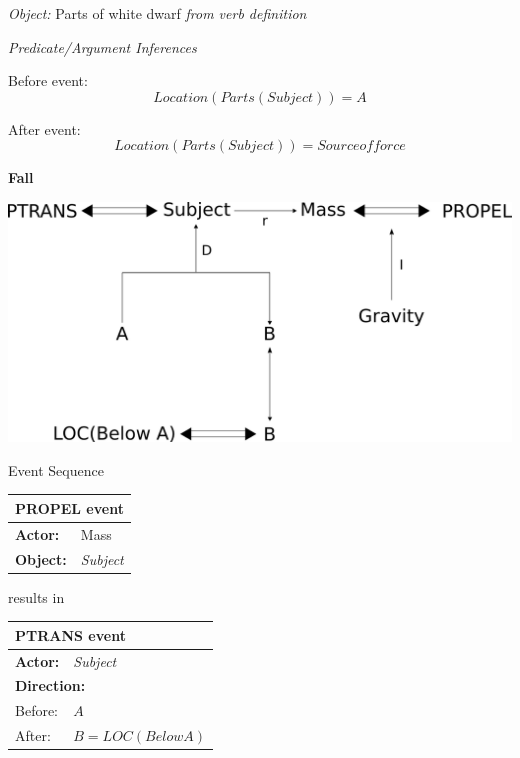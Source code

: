 \documentclass[../dissertation]{subfiles}
\begin{document}
\textit{Object:} Parts of white dwarf \textit{from verb definition}

\bigskip

\textit{Predicate/Argument Inferences}


Before event:
\[Location(Parts(Subject)) = A\]

After event:
\[Location(Parts(Subject)) = Source of force\]
\newpage

\textbf{Fall}

\bigskip
\includegraphics[width=\linewidth]{fall-cd.png}


Event Sequence

\begin{center}
  \begin{tabular}{l l}
  \toprule
  \multicolumn{2}{l}{\textbf{PROPEL event}}\\
  \hline
  \textbf{Actor:} & Mass\\
  \textbf{Object:} & \textit{Subject}\\
	\bottomrule
  \end{tabular}
  
  \smallskip
  results in
  \smallskip
  
  \begin{tabular}{l l}
    \toprule
    \multicolumn{2}{l}{\textbf{PTRANS event}}\\
    \hline
    \textbf{Actor:} & \textit{Subject}\\
    \multicolumn{2}{l}{\textbf{Direction:}} \\
    Before: & \(A\)\\
    After: & \(B = LOC(Below A)\)\\
    \bottomrule
  \end{tabular}
  
\end{center}
\end{document}

